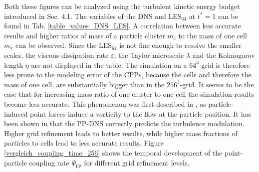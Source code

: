 \documentclass[11pt,a4paper,openany,oneside,parskip=half*]{article}
\begin{document}
Both these figures can be analyzed using the turbulent kinetic energy budget introduced in Sec. 4.1.
\newline
The variables of the DNS and $\mathrm{LES_{64}}$ at $t^* = 1$ can be found in Tab. \ref{table_values_DNS_LES}. A correlation between less accurate results and higher ratios of mass of a particle cluster $m_\mathrm{c}$ to the mass of one cell $m_\mathrm{v}$ can be observed. Since the $\mathrm{LES_{64}}$ is not fine enough to resolve the smaller scales, the viscous dissipation rate $\varepsilon$, the Taylor microscale $\lambda$ and the Kolmogorov length $\eta$ are not displayed in the table. The simulation on a $64^3$-grid is therefore less prone to the modeling error of the CPPs, because the cells and therefore the mass of one cell, are substantially bigger than in the $256^3$-grid. 
It seems to be the case that for increasing mass ratio of one cluster to one cell the simulation results become less accurate. This phenomenon was first described in \cite{maxey1997simulations}, as particle-induced point forces induce a vorticity to the flow at the particle position. 
\newline
It has been shown in \cite{Schneiders2016} that the PP-DNS correctly predicts the turbulence modulation. Higher grid refinement leads to better results, while higher mass fractions of particles to cells lead to less accurate results. 
Figure \ref{vergleich_coupling_time_256} shows the temporal development 
of the point-particle coupling rate $\Psi_\mathrm{pp}$ for different grid refinement levels. 
\end{document}
